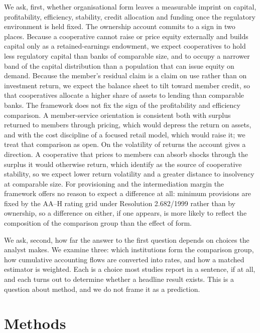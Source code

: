 \documentclass[11pt,a4paper]{article}
\begin{document}
We ask, first, whether organisational form leaves a measurable imprint on capital,
profitability, efficiency, stability, credit allocation and funding once the regulatory
environment is held fixed. The ownership account commits to a sign in two places. Because
a cooperative cannot raise or price equity externally and builds capital only as a
retained-earnings endowment, we expect cooperatives to hold less regulatory capital than
banks of comparable size, and to occupy a narrower band of the capital distribution than
a population that can issue equity on demand. Because the member's residual claim is a
claim on use rather than on investment return, we expect the balance sheet to tilt toward
member credit, so that cooperatives allocate a higher share of assets to lending than
comparable banks. The framework does not fix the sign of the profitability and efficiency
comparison. A member-service orientation is consistent both with surplus returned to
members through pricing, which would depress the return on assets, and with the cost
discipline of a focused retail model, which would raise it; we treat that comparison as
open. On the volatility of returns the account gives a direction. A cooperative that
prices to members can absorb shocks through the surplus it would otherwise return, which
\citet{hesse2007} identify as the source of cooperative stability, so we expect lower
return volatility and a greater distance to insolvency at comparable size. For
provisioning and the intermediation margin the framework offers no reason to expect a
difference at all: minimum provisions are fixed by the AA--H rating grid under Resolution
2.682/1999 \citep{cmn2682} rather than by ownership, so a difference on either, if one
appears, is more likely to reflect the composition of the comparison group than the
effect of form.

We ask, second, how far the answer to the first question depends on choices the analyst
makes. We examine three: which institutions form the comparison group, how cumulative
accounting flows are converted into rates, and how a matched estimator is weighted. Each
is a choice most studies report in a sentence, if at all, and each turns out to determine
whether a headline result exists. This is a question about method, and we do not frame it
as a prediction.

\section{Methods}
\end{document}
